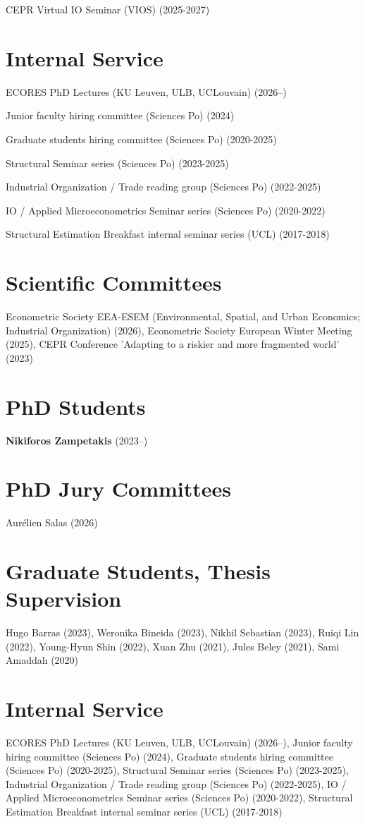 \documentclass[11pt,a4paper]{article}
\begin{document}
\noindent CEPR Virtual IO Seminar (VIOS) (2025-2027)


\section*{Internal Service}
\noindent ECORES PhD Lectures (KU Leuven, ULB, UCLouvain) (2026--)

\noindent Junior faculty hiring committee (Sciences Po) (2024)

\noindent Graduate students hiring committee (Sciences Po) (2020-2025)

\noindent Structural Seminar series (Sciences Po) (2023-2025)

\noindent Industrial Organization / Trade reading group (Sciences Po) (2022-2025)

\noindent IO / Applied Microeconometrics Seminar series (Sciences Po) (2020-2022)

\noindent Structural Estimation Breakfast internal seminar series (UCL) (2017-2018)


\section*{Scientific Committees}
\noindent Econometric Society EEA-ESEM (Environmental, Spatial, and Urban Economics; Industrial Organization) (2026), Econometric Society European Winter Meeting (2025), CEPR Conference 'Adapting to a riskier and more fragmented world' (2023)


\section*{PhD Students}
\noindent \textbf{Nikiforos Zampetakis} (2023--)


\section*{PhD Jury Committees}
\noindent Aurélien Salas (2026)


\section*{Graduate Students, Thesis Supervision}
\noindent Hugo Barras (2023), Weronika Bineida (2023), Nikhil Sebastian (2023), Ruiqi Lin (2022), Young-Hyun Shin (2022), Xuan Zhu (2021), Jules Beley (2021), Sami Amaddah (2020)


\section*{Internal Service}
\noindent ECORES PhD Lectures (KU Leuven, ULB, UCLouvain) (2026--), Junior faculty hiring committee (Sciences Po) (2024), Graduate students hiring committee (Sciences Po) (2020-2025), Structural Seminar series (Sciences Po) (2023-2025), Industrial Organization / Trade reading group (Sciences Po) (2022-2025), IO / Applied Microeconometrics Seminar series (Sciences Po) (2020-2022), Structural Estimation Breakfast internal seminar series (UCL) (2017-2018)
\end{document}
